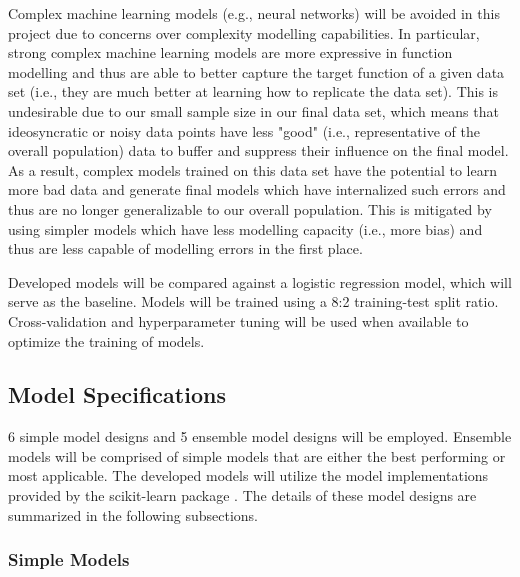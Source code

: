\documentclass[10pt,sigconf,letterpaper,nonacm]{acmart}
\begin{document}
Complex machine learning models (e.g., neural networks) will be avoided in this project due to concerns over complexity modelling capabilities.
In particular, strong complex machine learning models are more expressive in function modelling and thus are able to better capture the target function of a given data set (i.e., they are much better at learning how to replicate the data set).
This is undesirable due to our small sample size in our final data set, which means that ideosyncratic or noisy data points have less "good" (i.e., representative of the overall population) data to buffer and suppress their influence on the final model.
As a result, complex models trained on this data set have the potential to learn more bad data and generate final models which have internalized such errors and thus are no longer generalizable to our overall population.
This is mitigated by using simpler models which have less modelling capacity (i.e., more bias) and thus are less capable of modelling errors in the first place.

Developed models will be compared against a logistic regression model, which will serve as the baseline.
Models will be trained using a 8:2 training-test split ratio.
Cross-validation and hyperparameter tuning will be used when available to optimize the training of models.

\subsection{Model Specifications}

6 simple model designs and 5 ensemble model designs will be employed.
Ensemble models will be comprised of simple models that are either the best performing or most applicable.
The developed models will utilize the model implementations provided by the scikit-learn package \cite{scikit-learn}.
The details of these model designs \cite{sklearn_api, scikit_ref} are summarized in the following subsections.

\subsubsection{Simple Models}
\end{document}
